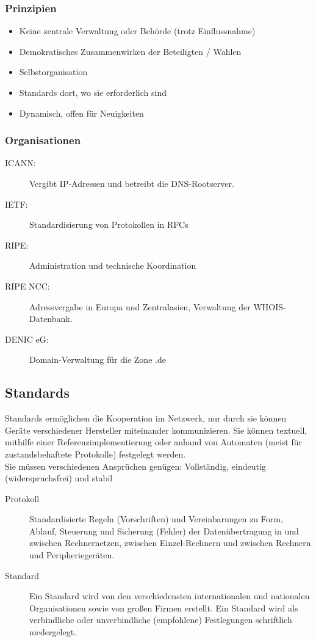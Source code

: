 \documentclass{article} %
\begin{document}
\subsubsection{Prinzipien}

\begin{itemize}
\item Keine zentrale Verwaltung oder Behörde (trotz Einflussnahme)
\item Demokratisches Zusammenwirken der Beteiligten / Wahlen
\item Selbstorganisation
\item Standards dort, wo sie erforderlich sind
\item Dynamisch, offen für Neuigkeiten	
\end{itemize}

\subsubsection{Organisationen}

\begin{description}
\item[ICANN:] Vergibt IP-Adressen und betreibt die DNS-Rootserver.
\item[IETF:] Standardisierung von Protokollen in RFCs \cite{rfc3233}
\item[RIPE:] Administration und technische Koordination
\item[RIPE NCC:] Adressvergabe in Europa und Zentralasien, Verwaltung der WHOIS-Datenbank.
\item[DENIC eG:] Domain-Verwaltung für die Zone .de
\end{description}

\subsection{Standards}
Standards ermöglichen die Kooperation im Netzwerk, nur durch sie können Geräte verschiedener Hersteller miteinander kommunizieren.
Sie können textuell, mithilfe einer Referenzimplementierung oder anhand von Automaten (meist für zustandsbehaftete Protokolle) festgelegt werden.\\
Sie müssen verschiedenen Ansprüchen genügen: Vollständig, eindeutig (widerspruchsfrei) und stabil 

\begin{description}
\item[Protokoll] Standardisierte Regeln (Vorschriften) und Vereinbarungen zu
Form, Ablauf, Steuerung und Sicherung (Fehler) der
Datenübertragung in und zwischen Rechnernetzen, zwischen
Einzel-Rechnern und zwischen Rechnern und
Peripheriegeräten.
\item[Standard] Ein Standard wird von den verschiedensten internationalen und
nationalen Organisationen sowie von großen Firmen erstellt.
Ein Standard wird als verbindliche oder unverbindliche
(empfohlene) Festlegungen schriftlich niedergelegt.
\end{description}
\end{document}
